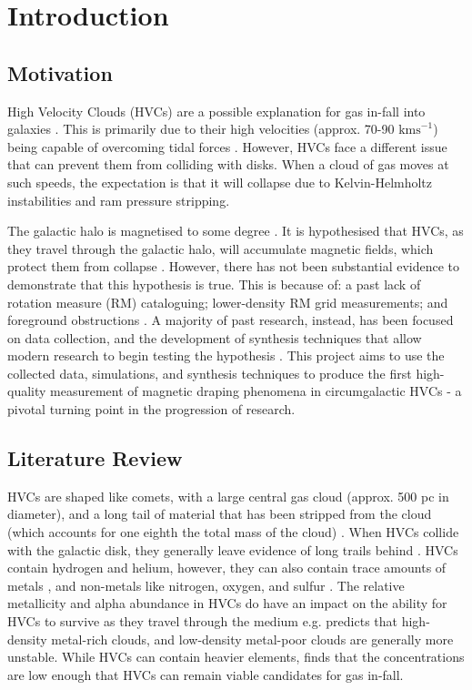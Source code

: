 \chapter{Introduction}
\label{cha:introduction}

\section{Motivation}
\label{sec:motivation}
High Velocity Clouds (HVCs) are a possible explanation for gas in-fall into galaxies \cite{ID7}. This is primarily due to their high velocities (approx. 70-90 $\mathrm{kms}^{-1}$) being capable of overcoming tidal forces \cite{ID7, ID8}. However, HVCs face a different issue that can prevent them from colliding with disks. When a cloud of gas moves at such speeds, the expectation is that it will collapse due to Kelvin-Helmholtz instabilities and ram pressure stripping\cite{ID23, ID33, ID11}.

The galactic halo is magnetised to some degree \cite{ID30}. It is hypothesised that HVCs, as they travel through the galactic halo, will accumulate magnetic fields, which protect them from collapse \cite{ID10, ID11, ID13, ID23, ID24, ID34}. However, there has not been substantial evidence to demonstrate that this hypothesis is true. This is because of: a past lack of rotation measure (RM) cataloguing; lower-density RM grid measurements; and foreground obstructions \cite{ID2, ID18, ID36}. A majority of past research, instead, has been focused on data collection, and the development of synthesis techniques that allow modern research to begin testing the hypothesis \cite{ID18, ID1, ID3, ID6, ID5, ID30, ID26}. This project aims to use the collected data, simulations, and synthesis techniques to produce the first high-quality measurement of magnetic draping phenomena in circumgalactic HVCs - a pivotal turning point in the progression of research.

\section{Literature Review}
\label{sec:lit-review}

HVCs are shaped like comets, with a large central gas cloud (approx. 500 pc in diameter), and a long tail of material that has been stripped from the cloud (which accounts for one eighth the total mass of the cloud) \cite{ID34, ID13}. When HVCs collide with the galactic disk, they generally leave evidence of long trails behind \cite{ID19}. HVCs contain hydrogen and helium, however, they can also contain trace amounts of metals \cite{ID46}, and non-metals like nitrogen, oxygen, and sulfur \cite{ID48, ID49}. The relative metallicity and alpha abundance in HVCs do have an impact on the ability for HVCs to survive as they travel through the medium e.g. \citep{ID24} predicts that high-density metal-rich clouds, and low-density metal-poor clouds are generally more unstable. While HVCs can contain heavier elements, \citep{ID46} finds that the concentrations are low enough that HVCs can remain viable candidates for gas in-fall.

